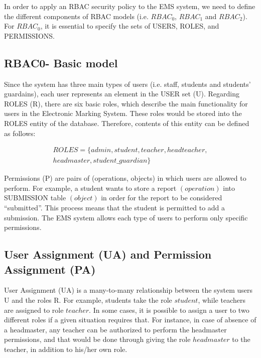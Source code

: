 In order to apply an RBAC security policy to the EMS system, we need to define the different components of RBAC models (i.e. $RBAC_0$, $RBAC_1$ and $RBAC_2$).  For $RBAC_0$, it is essential to specify the sets of USERS, ROLES, and PERMISSIONS.

\subsection{RBAC0- Basic model}
Since the system has three main types of users (i.e. staff, students and students' guardains), each user represents an element in the USER set (U).  Regarding ROLES (R), there are six basic roles, which describe the main functionality for users in the Electronic Marking System.  These roles would be stored into the ROLES entity of the database.  Therefore, contents of this entity can be defined as follows:

\begin{align*}
ROLES = \{admin, student, teacher, headteacher, \\headmaster, student\_guardian\}
\end{align*}


Permissions (P) are pairs of (operations, objects) in which users are allowed to perform.  For example, a student wants to store a report $(operation)$ into SUBMISSION table $(object)$ in order for the report to be considered “submitted”.  This process means that the student is permitted to add a submission.  The EMS system allows each type of users to perform only specific permissions. 


\subsection{User Assignment (UA) and Permission Assignment (PA)}
User Assignment (UA) is a many-to-many relationship between the system users U and the roles R.  For example, students take the role $student$, while teachers are assigned to role $teacher$.  In some cases, it is possible to assign a user to two different roles if a given situation requires that.  For instance, in case of absence of a headmaster, any teacher can be authorized to perform the headmaster permissions, and that would be done through giving the role $headmaster$ to the teacher, in addition to his/her own role.

